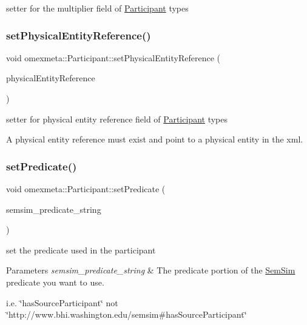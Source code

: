 setter for the multiplier field of \hyperlink{classomexmeta_1_1Participant}{Participant} types \mbox{\label{classomexmeta_1_1Participant_a415c1205762dff6943426d830d74edcd}} 
\subsubsection{\texorpdfstring{set\+Physical\+Entity\+Reference()}{setPhysicalEntityReference()}}
{\footnotesize\ttfamily void omexmeta\+::\+Participant\+::set\+Physical\+Entity\+Reference (\begin{DoxyParamCaption}\item[{const std\+::string \&}]{physical\+Entity\+Reference }\end{DoxyParamCaption})}



setter for physical entity reference field of \hyperlink{classomexmeta_1_1Participant}{Participant} types 

A physical entity reference must exist and point to a physical entity in the xml. \mbox{\label{classomexmeta_1_1Participant_a1188d6a2036514eb6b649ce1e08eca4d}} 
\subsubsection{\texorpdfstring{set\+Predicate()}{setPredicate()}}
{\footnotesize\ttfamily void omexmeta\+::\+Participant\+::set\+Predicate (\begin{DoxyParamCaption}\item[{const std\+::string \&}]{semsim\+\_\+predicate\+\_\+string }\end{DoxyParamCaption})}



set the predicate used in the participant 


\begin{DoxyParams}{Parameters}
{\em semsim\+\_\+predicate\+\_\+string} & The predicate portion of the \hyperlink{classomexmeta_1_1SemSim}{Sem\+Sim} predicate you want to use.\\
\hline
\end{DoxyParams}
i.\+e. \char`\"{}has\+Source\+Participant\char`\"{} not \char`\"{}http\+://www.\+bhi.\+washington.\+edu/semsim\#has\+Source\+Participant\char`\"{} \mbox{\label{classomexmeta_1_1Participant_a5e8f680950f55230587c0f85498c5047}} 
